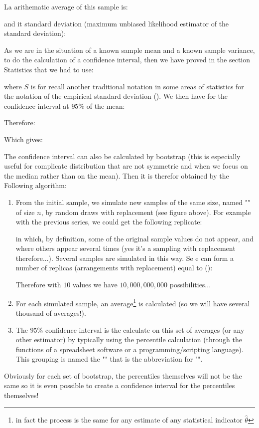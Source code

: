 	La arithematic average of this sample is:
	
	and it standard deviation (maximum unbiased likelihood estimator of the standard deviation):
	 
	As we are in the situation of a known sample mean and a known sample variance, to do the calculation of a confidence interval, then we have proved in the section Statistics that we had to use:
	
	where $S$ is for recall another traditional notation in some areas of statistics for the notation of the empirical standard deviation (). We then have for the confidence interval at $95\%$ of the mean:
		
	Therefore:
		
	Which gives:
	
	The confidence interval can also be calculated by bootstrap (this is especially useful for complicate distribution that are not symmetric and when we focus on the median rather than on the mean). Then it is therefor obtained by the Following algorithm:
	\begin{enumerate}
		\item From the initial sample, we simulate new samples of the same size, named "" of size $n$, by random draws with replacement (see figure above). For example with the previous series, we could get the following replicate:
		
		in which, by definition, some of the original sample values do not appear, and where others appear several times (yes it's a sampling with replacement therefore...). Several samples are simulated in this way. Se e can form a number of replicas (arrangements with replacement) equal to ():
		
		Therefore with $10$ values we have $10,000,000,000$ possibilities...
		
		\item For each simulated sample, an average\footnote{in fact the process is the same for any estimate of any statistical indicator $\hat{\theta}$} is calculated (so we will have several thousand of averages!). 
	
		\item The $95\%$ confidence interval is the calculate on this set of averages (or any other estimator) by typically using the percentile calculation (through the functions of a spreadsheet software or a programming/scripting language). This grouping is named the "" that is the abbreviation for "".
	\end{enumerate}
	Obviously for each set of bootstrap, the percentiles themselves will not be the same so it is even possible to create a confidence interval for the percentiles themselves!
	
